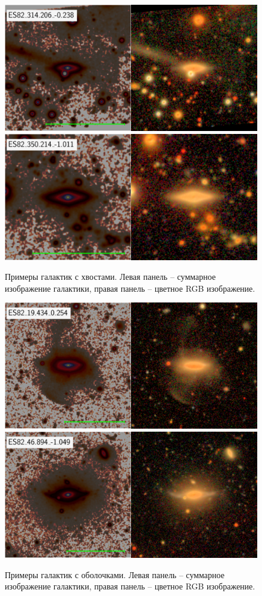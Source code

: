 

\begin{figure}[ht]

    \includegraphics[width=.5\textwidth]{images/526.png}\hfill
    \includegraphics[width=.5\textwidth]{images/777.png}\hfill
    \caption{Примеры галактик с хвостами. Левая панель -- суммарное изображение галактики, правая панель -- цветное RGB изображение.}\label{fig:tails}
\end{figure}

\begin{figure}[ht]

    \includegraphics[width=.5\textwidth]{images/222.png}\hfill
    \includegraphics[width=.5\textwidth]{images/424.png}\hfill

    \caption{Примеры галактик с оболочками. Левая панель -- суммарное изображение галактики, правая панель -- цветное RGB изображение.}\label{fig:shells}
\end{figure}


